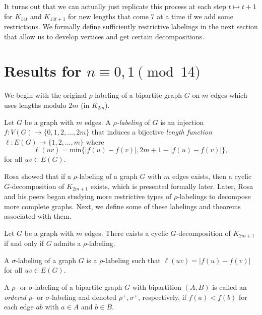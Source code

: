   It turns out that we can actually just replicate this process at each step $t\mapsto t+1$ for $K_{14t}$ and $K_{14t+1}$ for new lengths that come $7$ at a time if we add some restrictions. We formally define sufficiently restrictive labelings in the next section that allow us to develop vertices and get certain decompositions.
\section{Results for $n\equiv 0,1 \pmod{14}$}\label{sec:0,1results}

We begin with the original $\rho$-labeling of a bipartite graph $G$ on $m$ edges which uses lengths modulo $2m$ (in $K_{2m}$). 

\begin{definition} \label{def:rho} 
 Let $G$ be a graph with $m$ edges.  A \textit{$\rho$-labeling} of $G$ is an injection $f: V(G) \rightarrow \{0,1,2, \dots, 2m\}$ that induces a bijective \textit{length function $\ell: E(G) \rightarrow \{1,2, \dots, m\}$} where 
    $$
    \ell(uv) = \text{min}\{|f(u)-f(v)|,2m+1-|f(u)-f(v)|\},
    $$
for all  $uv \in E(G)$.
\end{definition}

Rosa showed that if a $\rho$-labeling of a graph $G$ with $m$ edges exists, then a cyclic $G$-decomposition of $K_{2m+1}$ exists, which is presented formally later. Later, Rosa and his peers began studying more restrictive types of $\rho$-labelings to decompose more complete graphs. Next, we define some of these labelings and theorems associated with them.

\begin{thm}\label{thm:Rhosa}  
Let $G$ be a graph with $m$ edges.  There exists a cyclic $G$-decomposition of $K_{2m+1}$ if and only if $G$ admits a $\rho$-labeling.
\end{thm}

\begin{definition} \label{def:sigma} 
A $\sigma$-labeling of a graph $G$ is a $\rho$-labeling such that $\ell(uv) = |f(u) - f(v)|$ for all $uv \in E(G).$
\end{definition}

\begin{definition} \label{def:rho and sigma ordered def} 
A $\rho$- or $\sigma$-labeling of a bipartite graph $G$ with bipartition $(A,B)$ is called an \emph{ordered} $\rho$- or $\sigma$-labeling and denoted $\rho^+,\sigma^+$, respectively, if $f(a) < f(b)$ for each edge $ab$ with $a \in A$ and $b \in B$.
\end{definition}


